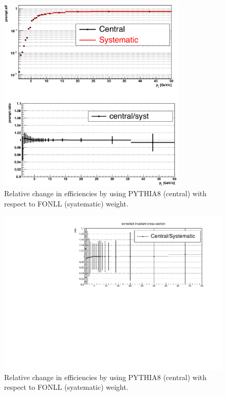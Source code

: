 \begin{figure}[!htb]
\begin{center}
 \includegraphics[width=0.8\textwidth]{figures/Dstar/pp13TeV/MCpTShape_syst.png}
 \caption{Relative change in efficiencies by using PYTHIA8 (central) with respect to FONLL (syatematic) weight.}
\label{fig:DstarPtWeights010}
\end{center}
\end{figure}

\begin{figure}[!htb]
\begin{center}
 \includegraphics[width=1\textwidth]{figures/Dstar/pp13TeV/ratio-cross-section-MC-pT-shpae.pdf} 
\caption{Relative change in efficiencies by using PYTHIA8 (central) with respect to FONLL (syatematic) weight.}
\label{fig:DstarPtWeights010_2}
\end{center}
\end{figure}




